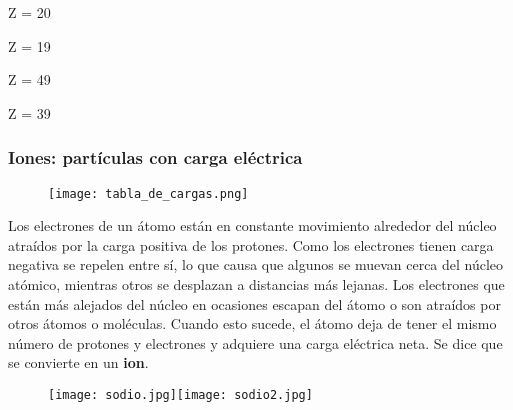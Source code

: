 \begin{boxK}
\begin{enumerate}
              \begin{hoptboxes}
                  \item Z = 20
                  \item Z = 19
                  \item Z = 49
                  \item Z = 39
              \end{hoptboxes}

    \end{enumerate}

\end{boxK}

\subsubsection{Iones: partículas con carga eléctrica}

\begin{figure}[H]
    \centering
    \texttt{[image: tabla\_de\_cargas.png]}
    \label{tab:tabla_de_cargas}
\end{figure}%

Los electrones de un átomo están en constante movimiento alrededor del núcleo atraídos por la carga positiva
de los protones. Como los electrones tienen carga negativa se repelen entre sí, lo que causa que algunos se
muevan cerca del núcleo atómico, mientras otros se desplazan a distancias más lejanas. Los electrones que están
más alejados del núcleo en ocasiones escapan del átomo o son atraídos por otros átomos o moléculas. Cuando esto
sucede, el átomo deja de tener el mismo número de protones y electrones y adquiere una carga eléctrica neta.
Se dice que se convierte en un \textbf{ion}.

\begin{figure}[H]
    \centering
    \texttt{[image: sodio.jpg]}\texttt{[image: sodio2.jpg]}
    \label{fig:sodio2}
\end{figure}%

